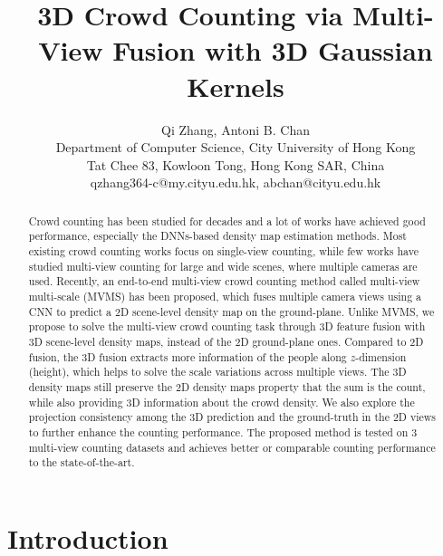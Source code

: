 \documentclass[letterpaper]{article} %
\title{3D Crowd Counting via Multi-View Fusion with 3D Gaussian Kernels}
\author{Qi Zhang, Antoni B. Chan \\ %
Department of Computer Science, City University of Hong Kong\\ %
Tat Chee 83, Kowloon Tong, Hong Kong SAR, China\\
qzhang364-c@my.cityu.edu.hk, abchan@cityu.edu.hk %
}
\begin{document}
\maketitle

\begin{abstract}
  Crowd counting has been studied for decades and a lot of works have achieved %
  good performance, especially the DNNs-based density map estimation methods. Most existing crowd counting works focus on single-view counting, while few works have studied multi-view counting for large and wide scenes, where multiple cameras are used.
  Recently, an end-to-end multi-view crowd counting method called multi-view multi-scale (MVMS) has been proposed, which fuses multiple camera views using a CNN to predict a 2D scene-level density map on the ground-plane. Unlike MVMS, we propose to solve the multi-view crowd counting task through 3D feature fusion with 3D scene-level density maps, instead of the 2D ground-plane ones. %
  Compared to 2D fusion, the 3D fusion extracts more information of the people along $z$-dimension (height), which helps to solve the scale variations across multiple views. The 3D density maps still preserve the 2D density maps property that the sum is the count, while also providing 3D information about the crowd density.
  We also explore the projection consistency among the 3D prediction and the ground-truth in the 2D views
  to further enhance the counting performance. The proposed method is tested on 3 multi-view counting datasets and achieves better or comparable counting performance to the state-of-the-art.
\end{abstract}
\section{Introduction}
\end{document}
